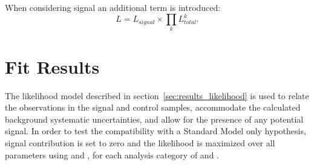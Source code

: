 When considering signal an additional term is introduced:
% 
\begin{equation}
L = L_{signal} \times \prod_k L^k_{total} .
\label{eq:total_likelihood_wsignal}
\end{equation}
% 







\section{Fit Results}  %
\label{sec:results_fit}
The likelihood model described in section~\ref{sec:results_likelihood} is used
to relate the observations in the signal and control samples, accommodate the
calculated background systematic uncertainties, and allow for the presence of
any potential signal. In order to test the compatibility with a Standard
Model only hypothesis, signal contribution is set to zero and the likelihood is
maximized over all parameters using \ROOFIT \cite{roofit} and \MINUIT
\cite{James:1975dr}, for each analysis category of \nb and \nj.

